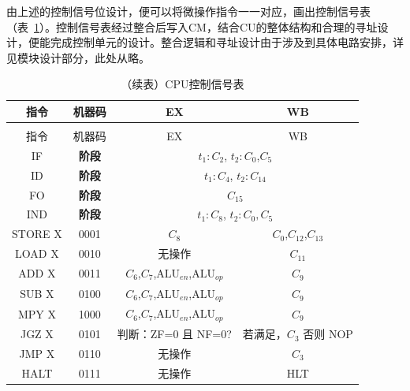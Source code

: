 \documentclass[lang=cn,a4paper,newtx]{elegantpaper}
\begin{document}
由上述的控制信号位设计，便可以将微操作指令一一对应，画出控制信号表（表~\ref{tab:five_stage_pipeline_ctrl}）。控制信号表经过整合后写入CM，结合CU的整体结构和合理的寻址设计，便能完成控制单元的设计。整合逻辑和寻址设计由于涉及到具体电路安排，详见模块设计部分，此处从略。
\begin{longtable}{cccc}
  \caption{CPU控制信号表} \label{tab:five_stage_pipeline_ctrl}\\
  \toprule
  指令 & 机器码  & EX & WB \\
  \midrule
  \endfirsthead

  \toprule
  \caption[]{（续表）CPU控制信号表} \\
  \toprule
  指令 & 机器码 & EX & WB \\
  \midrule
  \endhead

  \bottomrule
  \endlastfoot
  \rowcolor{red!10}
  IF & \textbf{阶段} & \multicolumn{2}{c}{$t_1:C_2$, $t_2:C_0$,$C_5$} \\
  \midrule
  \rowcolor{yellow!10}
  ID & \textbf{阶段} & \multicolumn{2}{c}{$t_1:C_4$,  $t_2:C_{14}$}\\
  \midrule
  \rowcolor{blue!10}
  FO & \textbf{阶段} & \multicolumn{2}{c}{$C_{15}$} \\
  \midrule
  \rowcolor{green!10}
  IND & \textbf{阶段} & \multicolumn{2}{c}{$t_1:C_8$, $t_2:C_0,C_5$}\\
  \midrule
  STORE X & 0001   & $C_8$ & $C_0$,$C_{12}$,$C_{13}$ \\

  LOAD X & 0010  & 
  无操作 & 
  $C_{11}$ \\
  \midrule
  ADD X & 0011 &
  
  $C_6$,$C_7$,$\text{ALU}_{en}$,$\text{ALU}_{op}$ & 
  $C_9$ \\

  SUB X & 0100 &
  $C_6$,$C_7$,$\text{ALU}_{en}$,$\text{ALU}_{op}$ & 
  $C_9$ \\
  MPY X & 1000 &
  $C_6$,$C_7$,$\text{ALU}_{en}$,$\text{ALU}_{op}$ &
  $C_9$ \\
  \midrule
  JGZ X & 0101 &
  
  判断：ZF=0 且 NF=0? & 
  \makecell{若满足，$C_3$\\否则 NOP} \\

  JMP X & 0110 &
  
  无操作 & 
  $C_3$ \\

  HALT & 0111 &
  
  无操作 & 
  HLT \\


\end{longtable}
\end{document}

